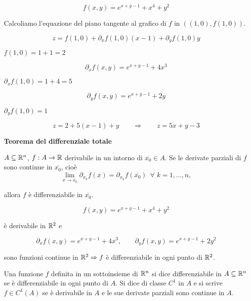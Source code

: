 \begin{exbar}
\begin{example}
	$$f(x,y)=e^{x+y-1}+x^4+y^2$$
	
	Calcoliamo l'equazione del piano tangente al grafico di $f$ in $((1,0),f(1,0))$.
	
	$$z=f(1,0)+\partial_xf(1,0)(x-1)+\partial_yf(1,0)y$$
	
	$f(1,0)=1+1=2$
	
	$$\partial_xf(x,y)=e^{x+y-1}+4x^3$$
	
	$\partial_x f(1,0)=1+4=5$
	
	$$\partial_yf(x,y)=e^{x+y-1}+2y$$
	
	$\partial_yf(1,0)=1$
	
	$$z=2+5(x-1)+y \qquad \Rightarrow \qquad z=5x+y-3$$
\end{example}
\end{exbar}


\begin{theorem} \textbf{Teorema del differenziale totale}
	
	$A \subseteq \mathbb{R}^n$, $f:A\rightarrow \mathbb{R}$ derivabile in un intorno di $\overline{x_0}\in A$. Se le derivate parziali di $f$ sono continue in $\overline{x_0}$, cioè
	\begin{equation*}
		\lim_{\overline{x}\rightarrow\overline{x_0}}\partial_{x_k}f(\overline{x})=\partial_{x_k}f(\overline{x_0})\,\,\, \forall \,\,k=1,...,n,
	\end{equation*}
	
	allora $f$ è differenziabile in $\overline{x_0}$.
\end{theorem}


\begin{exbar}
	$$f(x,y)=e^{x+y-1}+x^4+y^2$$
	
	è derivabile in $\mathbb{R}^2$ e 
	
	$$\partial_x f(x,y)=e^{x+y-1}+4x^3, \qquad \partial_y f(x,y)=e^{x+y-1}+2y^2$$
	
	sono funzioni continue in $\mathbb{R}^2 \Rightarrow f$ è differenziabile in ogni punto di $\mathbb{R}^2$.
\end{exbar}


\begin{definition}
	Una funzione $f$ definita in un sottoinsieme di $\mathbb{R}^n$ si dice differenziabile in $A \subseteq\mathbb{R}^n$ se è differenziabile in ogni punto di $A$. Si dice di classe $C^1$ in $A$ e si scrive $f \in C^1(A)$ se è derivabile in $A$ e le sue derivate parziali sono continue in $A$.
\end{definition}


